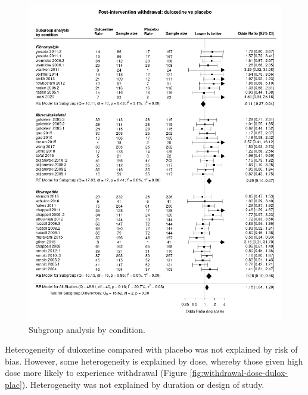 \documentclass{report}\usepackage[]{graphicx}\usepackage[]{color}
\begin{document}
\begin{figure}

\includegraphics[width=\textwidth]{img/withdrawal-condition-duloxetine-placebo-forest.png}
\caption[Withdrawal by condition: duloxetine]{
Subgroup analysis by condition. 
}
\label{fig:withdrawal-condition-dulox-plac}
\end{figure}

Heterogeneity of duloxetine compared with placebo was not explained by risk of bias. However, some heterogeneity is explained by dose, whereby those given high dose more likely to experience withdrawal (Figure \ref{fig:withdrawal-dose-dulox-plac}). Heterogeneity was not explained by duration or design of study.
\end{document}
